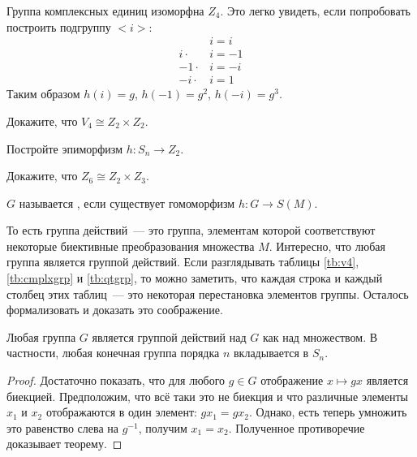 \begin{example}
	Группа комплексных единиц изоморфна $Z_4$. Это легко увидеть, если попробовать построить подгруппу $<i>$:
	\begin{align*}
	& i = i\\
	i\cdot & i = -1\\
	-1\cdot & i = -i\\
	-i\cdot& i = 1
	\end{align*}
	Таким образом $h(i) = g$, $h(-1) = g^2$, $h(-i) = g^3$.
\end{example}

\begin{exercise}
	Докажите, что $V_4\cong Z_2\times Z_2$.
\end{exercise}

\begin{exercise}
	Постройте эпиморфизм $h:S_n\to Z_2$.
\end{exercise}

\begin{exercise}
	Докажите, что $Z_6\cong Z_2\times Z_3$.
\end{exercise}

\begin{definition}
	$G$ называется , если существует гомоморфизм $h:G\to S(M)$.
\end{definition}

То есть группа действий~--- это группа, элементам которой соответствуют некоторые биективные преобразования множества $M$. Интересно, что любая группа является группой действий. Если разглядывать таблицы \ref{tb:v4}, \ref{tb:cmplxgrp} и \ref{tb:qtgrp}, то можно заметить, что каждая строка и каждый столбец этих таблиц~--- это некоторая перестановка элементов группы. Осталось формализовать и доказать это соображение.

\begin{thm}\label{thm:keli}
	Любая группа $G$ является группой действий над $G$ как над множеством. В частности, любая конечная группа порядка $n$ вкладывается в $S_n$.
\end{thm}
\begin{proof}
	Достаточно показать, что для любого $g\in G$ отображение $x\mapsto gx$ является биекцией. Предположим, что всё таки это не биекция и что различные элементы $x_1$ и $x_2$ отображаются в один элемент: $gx_1 = gx_2$. Однако, есть теперь умножить это равенство слева на $g^{-1}$, получим $x_1 = x_2$. Полученное противоречие доказывает теорему.
\end{proof}

